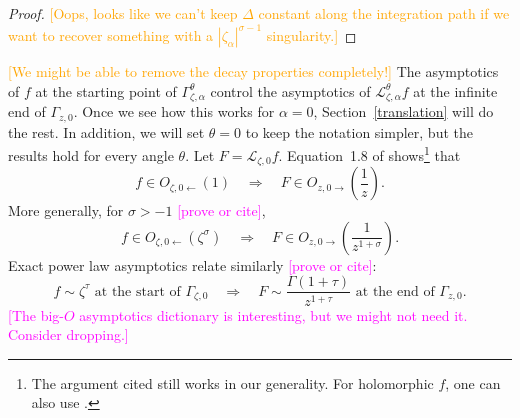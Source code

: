 \documentclass{article}
\let\Re\relax
\DeclareMathOperator{\Re}{Re}
\newcommand{\R}{\mathbb{R}}
\newcommand{\laplace}{\mathcal{L}}
\theoremstyle{definition}
\theoremstyle{plain}
\begin{document}
\begin{proof}
\textcolor{orange}{[Oops, looks like we can't keep $\Delta$ constant along the integration path if we want to recover something with a $|\zeta_\alpha|^{\sigma-1}$ singularity.]}
\end{proof}
\color{RoyalBlue}
\textcolor{orange}{[We might be able to remove the decay properties completely!]} The asymptotics of $f$ at the starting point of $\Gamma_{\zeta, \alpha}^\theta$ control the asymptotics of $\laplace_{\zeta, \alpha}^\theta f$ at the infinite end of $\Gamma_{z, 0}$. Once we see how this works for $\alpha = 0$, Section~\ref{translation} will do the rest. In addition, we will set $\theta=0$ to keep the notation simpler, but the results hold for every angle $\theta$. Let $F = \laplace_{\zeta, 0} f$. Equation~1.8 of \cite{laplace-tfm} shows\footnote{The argument cited still works in our generality. For holomorphic $f$, one can also use \cite[Equation 1.5]{sternin1995borel}.} that
\[ f \in O_{\zeta, 0 \leftarrow}(1) \quad\Longrightarrow\quad F \in O_{z, 0 \rightarrow}\left(\frac{1}{z}\right). \]
More generally, for $\sigma > -1$ \textcolor{magenta}{[prove or cite]},
\[ f \in O_{\zeta, 0 \leftarrow}(\zeta^\sigma) \quad\Longrightarrow\quad F \in O_{z, 0 \rightarrow}\left(\frac{1}{z^{1 + \sigma}}\right). \]
Exact power law asymptotics relate similarly \textcolor{magenta}{[prove or cite]}:
\[ f \sim \zeta^\tau \text{ at the start of } \Gamma_{\zeta, 0} \quad\Longrightarrow\quad F \sim \frac{\Gamma(1+\tau)}{z^{1+\tau}} \text{ at the end of } \Gamma_{z, 0}. \]
\textcolor{magenta}{[The big-$O$ asymptotics dictionary is interesting, but we might not need it. Consider dropping.]}
\color{black}
%
%
%
\end{document}
